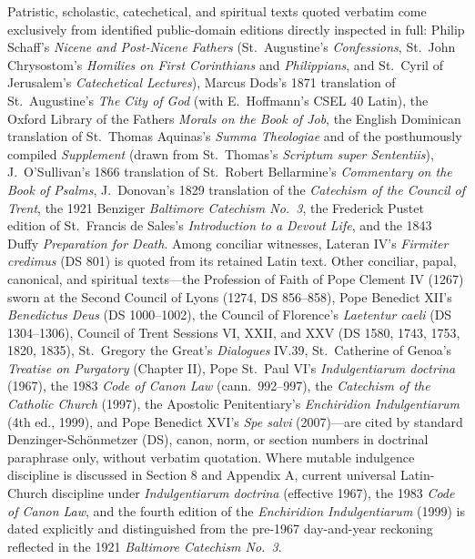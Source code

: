 Patristic, scholastic, catechetical, and spiritual texts quoted verbatim come exclusively from identified public-domain editions directly inspected in full: Philip Schaff's \textit{Nicene and Post-Nicene Fathers} (St.\ Augustine's \textit{Confessions}, St.\ John Chrysostom's \textit{Homilies on First Corinthians} and \textit{Philippians}, and St.\ Cyril of Jerusalem's \textit{Catechetical Lectures}), Marcus Dods's 1871 translation of St.\ Augustine's \textit{The City of God} (with E.\ Hoffmann's CSEL 40 Latin), the Oxford Library of the Fathers \textit{Morals on the Book of Job}, the English Dominican translation of St.\ Thomas Aquinas's \textit{Summa Theologiae} and of the posthumously compiled \textit{Supplement} (drawn from St.\ Thomas's \textit{Scriptum super Sententiis}), J.\ O'Sullivan's 1866 translation of St.\ Robert Bellarmine's \textit{Commentary on the Book of Psalms}, J.\ Donovan's 1829 translation of the \textit{Catechism of the Council of Trent}, the 1921 Benziger \textit{Baltimore Catechism No.\ 3}, the Frederick Pustet edition of St.\ Francis de Sales's \textit{Introduction to a Devout Life}, and the 1843 Duffy \textit{Preparation for Death}. Among conciliar witnesses, Lateran IV's \textit{Firmiter credimus} (DS 801) is quoted from its retained Latin text. Other conciliar, papal, canonical, and spiritual texts---the Profession of Faith of Pope Clement IV (1267) sworn at the Second Council of Lyons (1274, DS 856--858), Pope Benedict XII's \textit{Benedictus Deus} (DS 1000--1002), the Council of Florence's \textit{Laetentur caeli} (DS 1304--1306), Council of Trent Sessions VI, XXII, and XXV (DS 1580, 1743, 1753, 1820, 1835), St.\ Gregory the Great's \textit{Dialogues} IV.39, St.\ Catherine of Genoa's \textit{Treatise on Purgatory} (Chapter II), Pope St.\ Paul VI's \textit{Indulgentiarum doctrina} (1967), the 1983 \textit{Code of Canon Law} (cann.\ 992--997), the \textit{Catechism of the Catholic Church} (1997), the Apostolic Penitentiary's \textit{Enchiridion Indulgentiarum} (4th ed., 1999), and Pope Benedict XVI's \textit{Spe salvi} (2007)---are cited by standard Denzinger-Sch\"{o}nmetzer (DS), canon, norm, or section numbers in doctrinal paraphrase only, without verbatim quotation. Where mutable indulgence discipline is discussed in Section 8 and Appendix A, current universal Latin-Church discipline under \textit{Indulgentiarum doctrina} (effective 1967), the 1983 \textit{Code of Canon Law}, and the fourth edition of the \textit{Enchiridion Indulgentiarum} (1999) is dated explicitly and distinguished from the pre-1967 day-and-year reckoning reflected in the 1921 \textit{Baltimore Catechism No.\ 3}.

